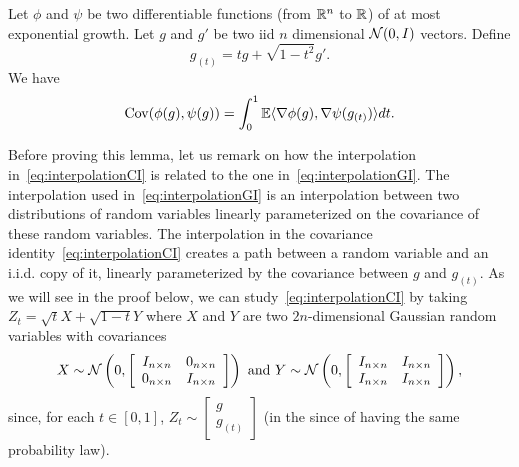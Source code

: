 \begin{lemma}\label{lemma:gaussiancovarianceidentity}
Let $\phi$ and $\psi$ be two differentiable functions (from $\mathbb{R}^n$ to $\mathbb{R}$) of at most exponential growth. Let $g$ and $g'$ be two iid $n$ dimensional $\mathcal{N}(0,I)$ vectors. Define
\begin{equation}\label{eq:interpolationCI}
g_{(t)} = tg + \sqrt{1-t^2}g'.
\end{equation}
We have
\[
\operatorname{Cov}(\phi(g),\psi(g)) = \int_{0}^1 \mathbb{E} \langle \nabla\phi(g),\nabla\psi(g_{(t)}) \rangle dt.
\]
\end{lemma}
Before proving this lemma, let us remark on how the interpolation in~\eqref{eq:interpolationCI} is related to the one in~\eqref{eq:interpolationGI}. The interpolation used in~\eqref{eq:interpolationGI} is an interpolation between two distributions of random variables linearly parameterized on the covariance of these random variables. The interpolation in the covariance identity~\eqref{eq:interpolationCI} creates a path between a random variable and an i.i.d. copy of it, linearly parameterized by the covariance between $g$ and $g_{(t)}$. As we will see in the proof below, we can study~\eqref{eq:interpolationCI} by taking $Z_t = \sqrt{t}X+\sqrt{1-t}Y$ where $X$ and $Y$ are two $2n$-dimensional Gaussian random variables with covariances
\begin{equation}\label{eq:2diffinterpolations}
X \sim \mathcal{N}\left( 0, \left[\begin{array}{cc} I_{n\times n} & 0_{n\times n} \\  0_{n\times n} & I_{n\times n} \end{array}\right]\right) \text{ and } Y \sim \mathcal{N}\left( 0, \left[\begin{array}{cc} I_{n\times n} & I_{n\times n} \\  I_{n\times n} & I_{n\times n} \end{array}\right]\right),
\end{equation}
since, for each $t\in[0,1]$, $Z_t \sim \left[\begin{array}{c} g \\ g_{(t)}\end{array}\right]$ (in the since of having the same probability law).

